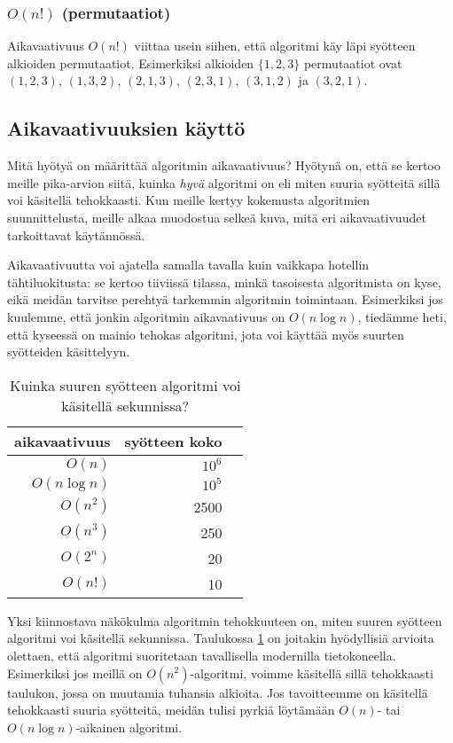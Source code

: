 \subsubsection{$O(n!)$ (permutaatiot)}

Aikavaativuus $O(n!)$ viittaa usein siihen,
että algoritmi käy läpi syötteen alkioiden permutaatiot.
Esimerkiksi alkioiden $\{1,2,3\}$ permutaatiot ovat
$(1,2,3)$, $(1,3,2)$, $(2,1,3)$, $(2,3,1)$, $(3,1,2)$ ja $(3,2,1)$.

\subsection{Aikavaativuuksien käyttö}

Mitä hyötyä on määrittää algoritmin aikavaativuus?
Hyötynä on, että se kertoo meille pika-arvion siitä,
kuinka \emph{hyvä} algoritmi on eli miten suuria syötteitä
sillä voi käsitellä tehokkaasti.
Kun meille kertyy kokemusta algoritmien suunnittelusta,
meille alkaa muodostua selkeä kuva,
mitä eri aikavaativuudet tarkoittavat käytännössä.

Aikavaativuutta voi ajatella samalla tavalla kuin vaikkapa
hotellin tähti\-luokitusta: se kertoo tiiviissä tilassa,
minkä tasoisesta algoritmista on kyse,
eikä meidän tarvitse perehtyä tarkemmin
algoritmin toimintaan.
Esimerkiksi jos kuulemme, että jonkin algoritmin aikavaativuus on $O(n \log n)$,
tiedämme heti, että kyseessä on mainio tehokas algoritmi,
jota voi käyttää myös suurten syötteiden käsittelyyn.

\begin{table}
\center
\begin{tabular}{rrr}
aikavaativuus & syötteen koko \\
\hline
$O(n)$ & $10^6$ & \\
$O(n \log n)$ & $10^5$ & \\
$O(n^2)$ & 2500 & \\
$O(n^3)$ & 250 & \\
$O(2^n)$ & 20 & \\
$O(n!)$ & 10 & \\
\end{tabular}
\caption{Kuinka suuren syötteen algoritmi voi käsitellä sekunnissa?}
\label{tab:algteh}
\end{table}

Yksi kiinnostava näkökulma algoritmin tehokkuuteen on,
miten suuren syötteen algoritmi voi käsitellä sekunnissa.
Taulukossa \ref{tab:algteh} on joitakin hyödyl\-lisiä arvioita
olettaen, että algoritmi suoritetaan tavallisella modernilla tietokoneella.
Esimerkiksi jos meillä on $O(n^2)$-algoritmi, voimme käsitellä sillä
tehokkaasti taulukon, jossa on muutamia tuhansia alkioita.
Jos tavoitteemme on käsitellä tehokkaasti suuria syötteitä,
meidän tulisi pyrkiä löytämään $O(n)$- tai $O(n \log n)$-aikainen
algoritmi.


